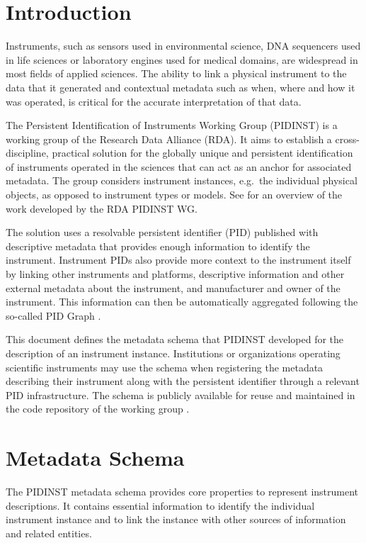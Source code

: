 \documentclass[titlepage=true,twoside=false,DIV=13]{scrartcl}
\begin{document}
\section{Introduction}
\label{intro}

Instruments, such as sensors used in environmental science, DNA
sequencers used in life sciences or laboratory engines used for
medical domains, are widespread in most fields of applied sciences.
The ability to link a physical instrument to the data that it
generated and contextual metadata such as when, where and how it was
operated, is critical for the accurate interpretation of that data.

The Persistent Identification of Instruments Working Group (PIDINST)
is a working group of the Research Data Alliance (RDA).  It aims to
establish a cross-discipline, practical solution for the globally
unique and persistent identification of instruments operated in the
sciences that can act as an anchor for associated metadata.  The group
considers instrument instances, e.g.\ the individual physical objects,
as opposed to instrument types or models.  See \cite{pidinst2020} for
an overview of the work developed by the RDA PIDINST WG.

The solution uses a resolvable persistent identifier (PID) published
with descriptive metadata that provides enough information to identify
the instrument.  Instrument PIDs also provide more context to the
instrument itself by linking other instruments and platforms,
descriptive information and other external metadata about the
instrument, and manufacturer and owner of the instrument.  This
information can then be automatically aggregated following the
so-called PID Graph \cite{pidgraph2021}.

This document defines the metadata schema that PIDINST developed for
the description of an instrument instance.  Institutions or
organizations operating scientific instruments may use the schema when
registering the metadata describing their instrument along with the
persistent identifier through a relevant PID infrastructure.  The
schema is publicly available for reuse and maintained in the code
repository of the working group \cite{pidinst:github}.

\section{Metadata Schema}
\label{schema}

The PIDINST metadata schema provides core properties to represent
instrument descriptions.  It contains essential information to
identify the individual instrument instance and to link the instance
with other sources of information and related entities.
\end{document}
